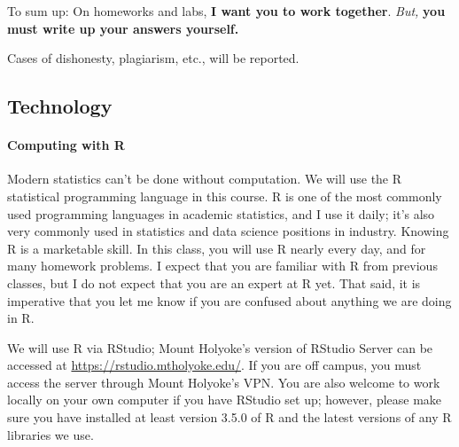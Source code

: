\documentclass[11pt]{article}
\begin{document}
To sum up: On homeworks and labs, \textbf{I want you to work together}.  \emph{But,} \textbf{you must write up your answers yourself.}

Cases of dishonesty, plagiarism, etc., will be reported.

\subsection*{Technology}

\paragraph{Computing with R}

Modern statistics can't be done without computation.  We will use the R statistical programming language in this course.  R is one of the most commonly used programming languages in academic statistics, and I use it daily; it's also very commonly used in statistics and data science positions in industry.  Knowing R is a marketable skill.  In this class, you will use R nearly every day, and for many homework problems.  I expect that you are familiar with R from previous classes, but I do not expect that you are an expert at R yet.  That said, it is imperative that you let me know if you are confused about anything we are doing in R.

We will use R via RStudio; Mount Holyoke's version of RStudio Server can be accessed at \url{https://rstudio.mtholyoke.edu/}. If you are off campus, you must access the server through Mount Holyoke's VPN. You are also welcome to work locally on your own computer if you have RStudio set up; however, please make sure you have installed at least version 3.5.0 of R and the latest versions of any R libraries we use.

\end{document}
